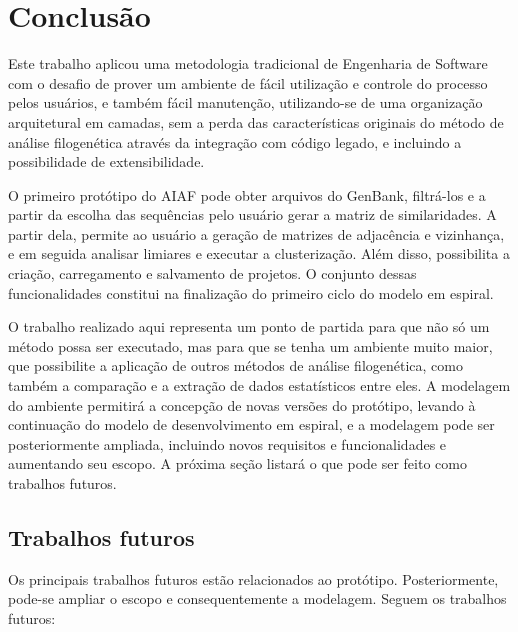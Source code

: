 \chapter{Conclusão} \label{cap:conclusao}

Este trabalho
aplicou uma metodologia tradicional de Engenharia de Software com o desafio de prover um ambiente de fácil utilização e controle do processo pelos usuários,
e também fácil manutenção, utilizando-se de uma organização arquitetural em camadas, sem a perda das características originais do método de análise
filogenética através da integração com código legado, e incluindo a possibilidade de extensibilidade.

O primeiro protótipo do AIAF pode obter arquivos do GenBank, filtrá-los e a partir da escolha das sequências pelo usuário gerar a matriz de similaridades.
A partir dela, permite ao usuário a geração de matrizes de adjacência e vizinhança, e em seguida analisar limiares e executar a clusterização.
Além disso, possibilita a criação, carregamento e salvamento de projetos. O conjunto dessas funcionalidades
constitui na finalização do primeiro ciclo do modelo em espiral.

O trabalho realizado aqui representa um ponto de partida para que não só um método possa ser executado, mas para que se tenha um ambiente muito maior, que
possibilite a aplicação de outros métodos de análise filogenética, como também a comparação e a extração de dados estatísticos entre eles. A modelagem do
ambiente permitirá a concepção de novas versões do protótipo, levando à continuação do modelo de desenvolvimento em espiral, e a modelagem pode
ser posteriormente ampliada, incluindo novos requisitos e funcionalidades e aumentando seu escopo. A próxima seção listará o que pode ser feito como trabalhos
futuros.

\section{Trabalhos futuros}

Os principais trabalhos futuros estão relacionados ao protótipo. Posteriormente, pode-se ampliar o escopo e consequentemente a modelagem. Seguem os trabalhos
futuros:

